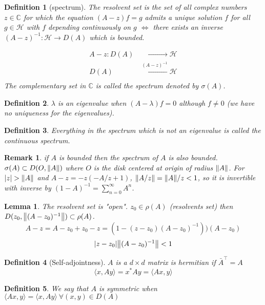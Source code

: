 \documentclass{article}
\newtheorem*{definition}{Definition}
\newtheorem*{lemma}{Lemma}
\newtheorem*{remark}{Remark}
\newcommand{\CC}{\mathbb{C}}
\newcommand{\cH}{\mathcal{H}}
\newcommand{\sig}{\sigma}
\newcommand{\la}{\lambda}
\renewcommand{\sp}[2]{\langle #1,#2 \rangle}
\newcommand{\T}[1]{#1^{\intercal}}
\begin{document}
\begin{definition}[spectrum] 
  The resolvent set is the set of all complex numbers $z \in \CC$ for which the equation $(A - z) f = g$ 
  admits a unique solution $f$ for all $g \in \cH$ with $f$ depending continuously on $g$ 
  $\Leftrightarrow$ there exists an inverse $(A - z)^{-1} \colon \cH \to D(A)$ which is bounded.
  \begin{align*}
  	A - z \colon D(A) & \xrightarrow{\phantom{(A-z)^{-1}}} \cH \\
                 D(A) & \xleftarrow{(A-z)^{-1}} \cH \\
  \end{align*}
  The complementary set in $\CC$ is called the spectrum denoted by $\sig(A)$.
\end{definition} 

\begin{definition} 
  $\la$ is an eigenvalue when $(A-\la) f = 0$ although $f \neq 0$ (we have no uniqueness for the eigenvalues).
\end{definition} 

\begin{definition} 
  Everything in the spectrum which is not an eigenvalue is called the continuous spectrum.
\end{definition} 

\begin{remark} 
  if $A$ is bounded then the spectrum of $A$ is also bounded.
  $\sig(A) \subset D(O,\norm{A})$ where $O$ is the disk centered at origin of radius $\norm{A}$.
  For $ \abs{z} > \norm{A}$ and $A - z = - z (-A/z + 1)$, $\norm{A/z} = \norm{A}/z < 1$, so it is invertible with inverse by $(1 - A)^{-1} = \sum_{n=0}^\infty A^n$.
\end{remark} 

\begin{lemma} 
  The resolvent set is "open". 
  $z_0 \in \rho(A)$ (resolvents set) then $D(z_0,\norm{(A - z_0)^{-1}}) \subset \rho(A)$.
  $$ A - z = A - z_0 + z_0 - z = (1 - (z-z_0)(A-z_0)^{-1}))(A-z_0) $$
  $$ \abs{z - z_0} \norm{(A-z_0)^{-1}} < 1 $$
\end{lemma} 

\begin{definition}[Self-adjointness]
  $A$ is a $d \times d$ matrix is hermitian if $\T{\bar{A}} = A$
  $$ \sp{x}{A y} = x^* A y = \sp{A x}{y} $$
\end{definition} 

\begin{definition}
  We say that $A$ is symmetric when $\sp{Ax}{y} = \sp{x}{Ay} \ \forall (x,y) \in D(A)$
\end{definition} 
\end{document}
